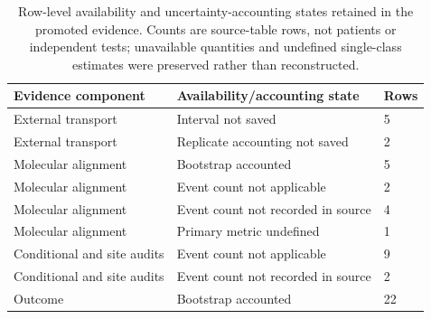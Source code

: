 \begin{table}[H]
\centering
\scriptsize
\caption{Row-level availability and uncertainty-accounting states retained in the promoted evidence. Counts are source-table rows, not patients or independent tests; unavailable quantities and undefined single-class estimates were preserved rather than reconstructed.}
\label{tab:supp-missingness-summary}
\begin{tabular}{@{}p{}p{}p{}@{}}
\toprule
Evidence component & Availability/accounting state & Rows \\
\midrule
External transport & Interval not saved & 5 \\
External transport & Replicate accounting not saved & 2 \\
Molecular alignment & Bootstrap accounted & 5 \\
Molecular alignment & Event count not applicable & 2 \\
Molecular alignment & Event count not recorded in source & 4 \\
Molecular alignment & Primary metric undefined & 1 \\
Conditional and site audits & Event count not applicable & 9 \\
Conditional and site audits & Event count not recorded in source & 2 \\
Outcome & Bootstrap accounted & 22 \\
\bottomrule
\end{tabular}
\end{table}
